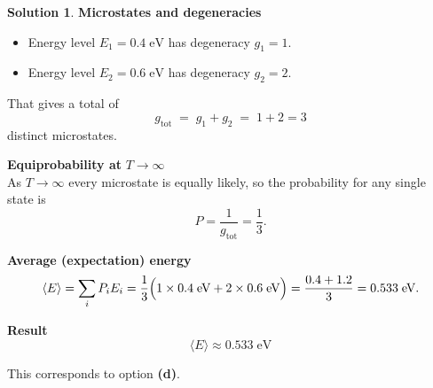 \documentclass[12pt]{article}
\theoremstyle{definition} %
\newtheorem{solution}{Solution}
\theoremstyle{plain} %
\begin{document}
              \begin{solution}
                \textbf{Microstates and degeneracies}\\
                \begin{itemize}
                  \item Energy level \(E_1 = 0.4\;\text{eV}\) has degeneracy \(g_1 = 1\).
                  \item Energy level \(E_2 = 0.6\;\text{eV}\) has degeneracy \(g_2 = 2\).
                \end{itemize}
                That gives a total of
                \[
                g_{\text{tot}} \;=\; g_1 + g_2 \;=\; 1 + 2 = 3
                \]
                distinct microstates.
                
                \medskip
                \textbf{Equiprobability at }\(T \to \infty\)\\
                As \(T \to \infty\) every microstate is equally likely, so the probability for
                any single state is
                \[
                P = \frac{1}{g_{\text{tot}}} = \frac{1}{3}.
                \]
                
                \medskip
                \textbf{Average (expectation) energy}\\
                \[
                \langle E \rangle
                  = \sum_{i} P_i E_i
                  = \frac{1}{3}\Bigl(
                      1 \times 0.4\;\text{eV}
                      + 2 \times 0.6\;\text{eV}
                    \Bigr)
                  = \frac{0.4 + 1.2}{3}
                  = 0.533\;\text{eV}.
                \]
                
                \medskip
                \textbf{Result}\\
                \[
                \boxed{\langle E \rangle \approx 0.533\;\text{eV}}
                \]
                
                This corresponds to option \textbf{(d)}.
                \end{solution}
                \pagebreak
\end{document}
